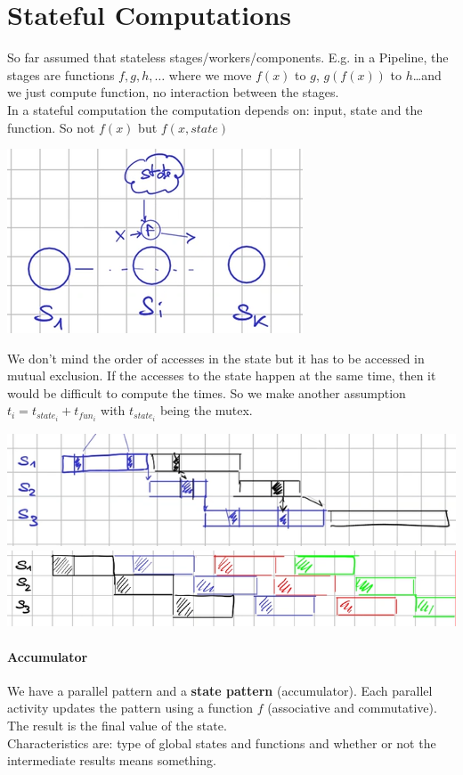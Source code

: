 \documentclass[10pt]{report}
\begin{document}
\section{Stateful Computations} So far assumed that stateless stages/workers/components. E.g. in a Pipeline, the stages are functions $f,g,h,\ldots$ where we move $f(x)$ to $g$, $g(f(x))$ to $h$\ldots and we just compute function, no interaction between the stages.\\
In a stateful computation the computation depends on: input, state and the function. So not $f(x)$ but $f(x, state)$
\begin{center}
	\includegraphics[scale=0.5]{18.png}
\end{center}
We don't mind the order of accesses in the state but it has to be accessed in mutual exclusion. If the accesses to the state happen at the same time, then it would be difficult to compute the times. So we make another assumption $t_i = t_{state_i} + t_{fun_i}$ with $t_{state_i}$ being the mutex.
\begin{center}
	\includegraphics[scale=0.5]{19.png}\\
	\includegraphics[scale=0.5]{20.png}
\end{center}
\paragraph{Accumulator} We have a parallel pattern and a \textbf{state pattern} (accumulator). Each parallel activity updates the pattern using a function $f$ (associative and commutative). The result is the final value of the state.\\
Characteristics are: type of global states and functions and whether or not the intermediate results means something.
\end{document}
